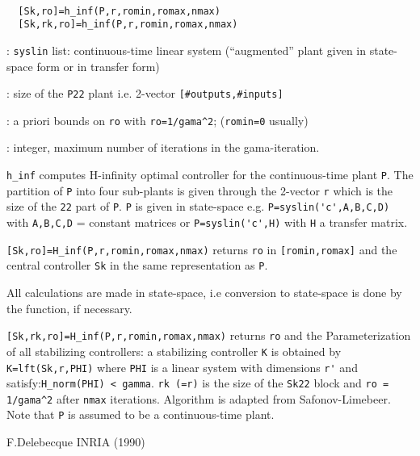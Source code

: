 \begin{mandesc}
   \\ %
\end{mandesc}
\begin{calling_sequence}
\begin{verbatim}
  [Sk,ro]=h_inf(P,r,romin,romax,nmax)  
  [Sk,rk,ro]=h_inf(P,r,romin,romax,nmax)  
\end{verbatim}
\end{calling_sequence}
\begin{parameters}
  \begin{varlist}

    : \verb!syslin! list: continuous-time linear system (``augmented''
    plant given in state-space form or in transfer form)

    : size of the \verb!P22! plant i.e. 2-vector
    \verb![#outputs,#inputs]!
    
    : a priori bounds on \verb!ro! with \verb!ro=1/gama^2!;
    (\verb!romin=0!  usually)

    : integer, maximum number of iterations in the gama-iteration.
  \end{varlist}
\end{parameters}
\begin{mandescription}
  \verb!h_inf! computes H-infinity optimal controller for the continuous-time
  plant \verb!P!.  The partition of \verb!P! into four sub-plants is given
  through the 2-vector \verb!r! which is the size of the \verb!22! part of
  \verb!P!. \verb!P! is given in state-space e.g. \verb!P=syslin('c',A,B,C,D)!
  with \verb!A,B,C,D! = constant matrices or \verb!P=syslin('c',H)! with
  \verb!H! a transfer matrix. 

  \verb![Sk,ro]=H_inf(P,r,romin,romax,nmax)! returns
  \verb!ro! in \verb![romin,romax]! and the central controller \verb!Sk! in the
  same representation as \verb!P!. 

  All calculations are made in state-space,
  i.e conversion to state-space is done by the function, if necessary. 

  \verb![Sk,rk,ro]=H_inf(P,r,romin,romax,nmax)! 
  returns \verb!ro! and the Parameterization of all stabilizing controllers: a
  stabilizing controller \verb!K! is obtained by \verb!K=lft(Sk,r,PHI)! where
  \verb!PHI! is a linear system with dimensions \verb!r'! and
  satisfy:\verb!H_norm(PHI) < gamma!.  \verb!rk (=r)! is the size of the
  \verb!Sk22! block and \verb!ro = 1/gama^2!  after \verb!nmax! iterations.
  Algorithm is adapted from Safonov-Limebeer. Note that \verb!P! is assumed to
  be a continuous-time plant.
\end{mandescription}
\begin{manseealso}
      
\end{manseealso}
\begin{authors}
  F.Delebecque INRIA (1990)  
\end{authors}
